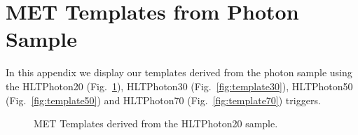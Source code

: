 \clearpage
\section{MET Templates from Photon Sample}
\label{sec:appendix_templates}

In this appendix we display our templates derived from the photon sample 
using the HLTPhoton20 (Fig.~\ref{fig:template20}), HLTPhoton30 (Fig.~\ref{fig:template30}),
HLTPhoton50 (Fig.~\ref{fig:template50}) and HLTPhoton70 (Fig.~\ref{fig:template70}) triggers.


\begin{figure}[hbt]
  \begin{center}
    \caption{MET Templates derived from the HLTPhoton20 sample.}
    \label{fig:template20}
  \end{center}
\end{figure}

